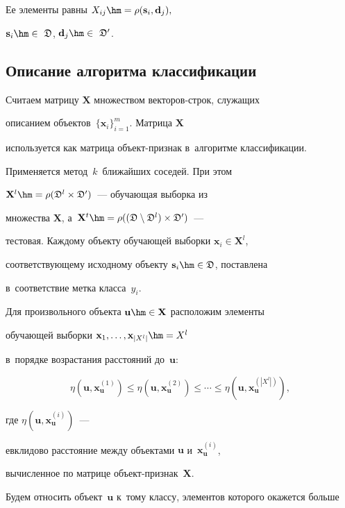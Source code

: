 Ее элементы равны $X_{ij} \hm= \rho(\mathbf{s}_i,\mathbf{d}_j),$ 

$\mathbf{s}_i\hm \in~\fD$, $\mathbf{d}_j\hm\in~\fD'$.



\subsection{Описание алгоритма классификации}



Считаем матрицу $\mathbf{X}$ множеством векторов-строк, служащих 

описанием объектов~$\{\mathbf{x}_i\}_{i=1}^m$. Матрица $\mathbf{X}$ 

используется как матрица объект-признак в~алгоритме классификации.

Применяется метод~$k$~ближайших соседей. При этом 

$\mathbf{X}^l\hm = {\rho}(\fD^l\times\fD')$~--- обучающая выборка из 

множества $\mathbf{X}$, а~$\mathbf{X}^t \hm= {\rho}( (\fD\setminus\fD^l)\times\fD')$~--- 

тестовая. Каждому объекту обучающей выборки $\mathbf{x}_i \in \mathbf{X}^l$, 

соответствующему исходному объекту $\mathbf{s}_i\hm \in \fD$, поставлена 

в~соответствие метка класса~$y_i$.



Для произвольного объекта $\mathbf{u}\hm\in \mathbf{X}$ расположим элементы 

обучающей выборки ${\mathbf{x}_1,\ldots,\mathbf{x}_{|X^l|}} \hm= X^l$ 

в~порядке возрастания расстояний до~$\mathbf{u}$:

$$

\eta(\mathbf{u},\mathbf{x}^{(1)}_\mathbf{u})\leq\eta(\mathbf{u},\mathbf{x}^{(2)}_{\mathbf{u}})\leq\cdots

\leq\eta(\mathbf{u},\mathbf{x}^{(|X^l|)}_{\mathbf{u}}),$$

где $\eta(\mathbf{u},\mathbf{x}^{(i)}_{\mathbf{u}})$~--- 

евклидово расстояние между объектами $\mathbf{u}$ и~$\mathbf{x}^{(i)}_{\mathbf{u}}$, 

вычисленное по матрице объект-признак~$\mathbf{X}$.

 Будем относить объект~$\mathbf{u}$ к~тому классу, элементов которого окажется больше 

